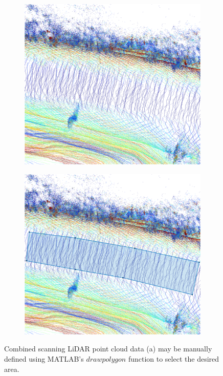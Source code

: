 \documentclass[numbered,pdftex]{ohio-etd}
\begin{document}
{{		\begin{figure}[H]
			\centering
			\begin{subfigure}{0.45\textwidth}
				\centering
				\includegraphics[width=1.0\linewidth]{Defense_Images/pre_area_select}
				\caption[Road area on Point Cloud]{}
				\label{fig:pre_select_area}
			\end{subfigure}
			\begin{subfigure}{0.45\textwidth}
				\centering
				\includegraphics[width=1.0\linewidth]{Defense_Images/post_area_select}
				\caption[Selected Road area on Point Cloud]{}
				\label{fig:area_selected}
			\end{subfigure}
			\caption[Manual Area Selection Process]{Combined scanning LiDAR point cloud data (a) may be manually defined using MATLAB's $drawpolygon$ function to select the desired area. }
			\label{fig:Area_Selection_Process}
		\end{figure}
	
}}
\end{document}
